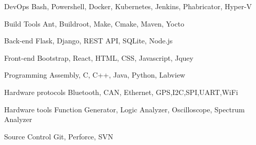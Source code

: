 

\begin{cvskills}

  \cvskill
    {DevOps} %
    {Bash, Powershell, Docker, Kubernetes, Jenkins, Phabricator, Hyper-V} %


  \cvskill
    {Build Tools} %
    {Ant, Buildroot, Make, Cmake, Maven, Yocto} %


  \cvskill
    {Back-end} %
    {Flask, Django, REST API, SQLite, Node.js} %

  \cvskill
    {Front-end} %
    {Bootstrap, React, HTML, CSS, Javascript, Jquey} %

  \cvskill
    {Programming} %
    {Assembly, C, C++, Java, Python, Labview} %
    
  \cvskill
    {Hardware protocols} %
    {Bluetooth, CAN, Ethernet, GPS,I2C,SPI,UART,WiFi} %


  \cvskill
    {Hardware tools} %
    {Function Generator, Logic Analyzer, Oscilloscope, Spectrum Analyzer} %


  \cvskill
    {Source Control} %
    {Git, Perforce, SVN} %

\end{cvskills}
